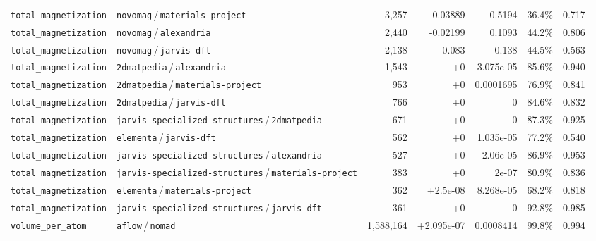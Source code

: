 \begin{longtable}{llrrrrr}
\texttt{total\_magnetization} & \texttt{novomag}\,/\,\texttt{materials-project} & 3{,}257 & -0.03889 & 0.5194 & 36.4\% & 0.717 \\
\texttt{total\_magnetization} & \texttt{novomag}\,/\,\texttt{alexandria} & 2{,}440 & -0.02199 & 0.1093 & 44.2\% & 0.806 \\
\texttt{total\_magnetization} & \texttt{novomag}\,/\,\texttt{jarvis-dft} & 2{,}138 & -0.083 & 0.138 & 44.5\% & 0.563 \\
\texttt{total\_magnetization} & \texttt{2dmatpedia}\,/\,\texttt{alexandria} & 1{,}543 & +0 & 3.075e-05 & 85.6\% & 0.940 \\
\texttt{total\_magnetization} & \texttt{2dmatpedia}\,/\,\texttt{materials-project} & 953 & +0 & 0.0001695 & 76.9\% & 0.841 \\
\texttt{total\_magnetization} & \texttt{2dmatpedia}\,/\,\texttt{jarvis-dft} & 766 & +0 & 0 & 84.6\% & 0.832 \\
\texttt{total\_magnetization} & \texttt{jarvis-specialized-structures}\,/\,\texttt{2dmatpedia} & 671 & +0 & 0 & 87.3\% & 0.925 \\
\texttt{total\_magnetization} & \texttt{elementa}\,/\,\texttt{jarvis-dft} & 562 & +0 & 1.035e-05 & 77.2\% & 0.540 \\
\texttt{total\_magnetization} & \texttt{jarvis-specialized-structures}\,/\,\texttt{alexandria} & 527 & +0 & 2.06e-05 & 86.9\% & 0.953 \\
\texttt{total\_magnetization} & \texttt{jarvis-specialized-structures}\,/\,\texttt{materials-project} & 383 & +0 & 2e-07 & 80.9\% & 0.836 \\
\texttt{total\_magnetization} & \texttt{elementa}\,/\,\texttt{materials-project} & 362 & +2.5e-08 & 8.268e-05 & 68.2\% & 0.818 \\
\texttt{total\_magnetization} & \texttt{jarvis-specialized-structures}\,/\,\texttt{jarvis-dft} & 361 & +0 & 0 & 92.8\% & 0.985 \\
\texttt{volume\_per\_atom} & \texttt{aflow}\,/\,\texttt{nomad} & 1{,}588{,}164 & +2.095e-07 & 0.0008414 & 99.8\% & 0.994 \\
\end{longtable}
